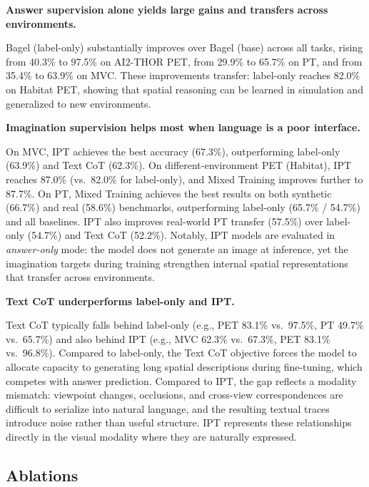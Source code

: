 \documentclass{llmxive}
\begin{document}
\begin{takeawayblock}
    \textbf{Answer supervision alone yields large gains and transfers across environments.}
\end{takeawayblock}
Bagel (label-only) substantially improves over Bagel (base) across all tasks, rising from 40.3\% to 97.5\% on AI2-THOR PET, from 29.9\% to 65.7\% on PT, and from 35.4\% to 63.9\% on MVC.
These improvements transfer: label-only reaches 82.0\% on Habitat PET, showing that spatial reasoning can be learned in simulation and generalized to new environments.

\begin{takeawayblock}
    \textbf{Imagination supervision helps most when language is a poor interface.}
\end{takeawayblock}
On MVC, IPT achieves the best accuracy (67.3\%), outperforming label-only (63.9\%) and Text CoT (62.3\%).
On different-environment PET (Habitat), IPT reaches 87.0\% (vs.\ 82.0\% for label-only), and Mixed Training improves further to 87.7\%.
On PT, Mixed Training achieves the best results on both synthetic (66.7\%) and real (58.6\%) benchmarks, outperforming label-only (65.7\% / 54.7\%) and all baselines.
IPT also improves real-world PT transfer (57.5\%) over label-only (54.7\%) and Text CoT (52.2\%).
Notably, IPT models are evaluated in \emph{answer-only} mode: the model does not generate an image at inference, yet the imagination targets during training strengthen internal spatial representations that transfer across environments.

\begin{takeawayblock}
    \textbf{Text CoT underperforms label-only and IPT.}
\end{takeawayblock}
Text CoT typically falls behind label-only (e.g., PET 83.1\% vs.\ 97.5\%, PT 49.7\% vs.\ 65.7\%) and also behind IPT (e.g., MVC 62.3\% vs.\ 67.3\%, PET 83.1\% vs.\ 96.8\%).
Compared to label-only, the Text CoT objective forces the model to allocate capacity to generating long spatial descriptions during fine-tuning, which competes with answer prediction.
Compared to IPT, the gap reflects a modality mismatch: viewpoint changes, occlusions, and cross-view correspondences are difficult to serialize into natural language, and the resulting textual traces introduce noise rather than useful structure. IPT represents these relationships directly in the visual modality where they are naturally expressed.
\vspace{-1em}
\subsection{Ablations}
\label{sec:exp_ablation}
\end{document}
